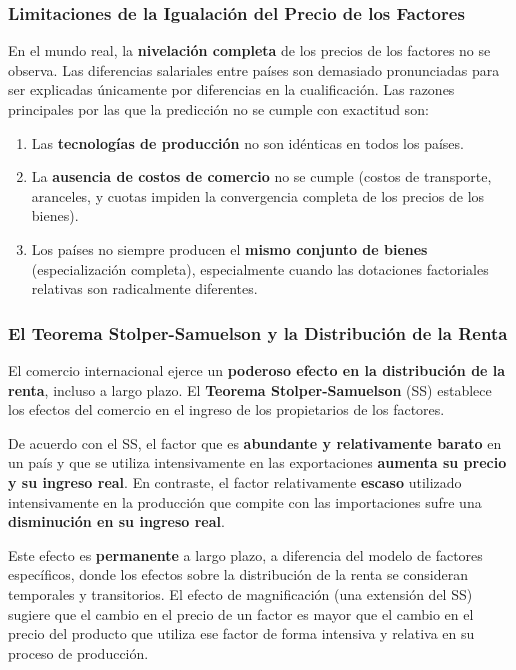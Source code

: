 \subsubsection{Limitaciones de la Igualación del Precio de los Factores}
En el mundo real, la \textbf{nivelación completa} de los precios de los factores no se observa. Las diferencias salariales entre países son demasiado pronunciadas para ser explicadas únicamente por diferencias en la cualificación. Las razones principales por las que la predicción no se cumple con exactitud son:
\begin{enumerate}
    \item Las \textbf{tecnologías de producción} no son idénticas en todos los países.
    \item La \textbf{ausencia de costos de comercio} no se cumple (costos de transporte, aranceles, y cuotas impiden la convergencia completa de los precios de los bienes).
    \item Los países no siempre producen el \textbf{mismo conjunto de bienes} (especialización completa), especialmente cuando las dotaciones factoriales relativas son radicalmente diferentes.
\end{enumerate}

\subsubsection{El Teorema Stolper-Samuelson y la Distribución de la Renta}
El comercio internacional ejerce un \textbf{poderoso efecto en la distribución de la renta}, incluso a largo plazo. El \textbf{Teorema Stolper-Samuelson} (SS) establece los efectos del comercio en el ingreso de los propietarios de los factores.

\begin{teorema}
De acuerdo con el SS, el factor que es \textbf{abundante y relativamente barato} en un país y que se utiliza intensivamente en las exportaciones \textbf{aumenta su precio y su ingreso real}. En contraste, el factor relativamente \textbf{escaso} utilizado intensivamente en la producción que compite con las importaciones sufre una \textbf{disminución en su ingreso real}.
\end{teorema}
Este efecto es \textbf{permanente} a largo plazo, a diferencia del modelo de factores específicos, donde los efectos sobre la distribución de la renta se consideran temporales y transitorios. El efecto de magnificación (una extensión del SS) sugiere que el cambio en el precio de un factor es mayor que el cambio en el precio del producto que utiliza ese factor de forma intensiva y relativa en su proceso de producción.

